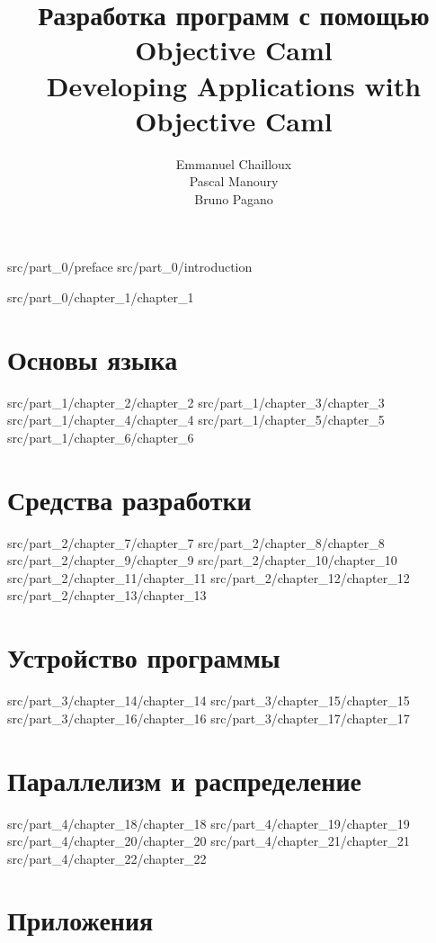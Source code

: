 \documentclass[12pt,a4paper]{book}
\begin{document}
\title{Разработка программ с помощью Objective Caml\\
Developing Applications with Objective Caml}
\author{Emmanuel Chailloux\\ Pascal Manoury\\ Bruno Pagano}

\maketitle

 {src/part_0/preface}
 {src/part_0/introduction}

\tableofcontents

 {src/part_0/chapter_1/chapter_1}

\part{Основы языка}
 {src/part_1/chapter_2/chapter_2}
 {src/part_1/chapter_3/chapter_3}
 {src/part_1/chapter_4/chapter_4}
 {src/part_1/chapter_5/chapter_5}
 {src/part_1/chapter_6/chapter_6}

\part{Средства разработки}
 {src/part_2/chapter_7/chapter_7}
 {src/part_2/chapter_8/chapter_8}
 {src/part_2/chapter_9/chapter_9}
 {src/part_2/chapter_10/chapter_10}
 {src/part_2/chapter_11/chapter_11}
 {src/part_2/chapter_12/chapter_12}
 {src/part_2/chapter_13/chapter_13}

\part{Устройство программы}
 {src/part_3/chapter_14/chapter_14}
 {src/part_3/chapter_15/chapter_15}
 {src/part_3/chapter_16/chapter_16}
 {src/part_3/chapter_17/chapter_17}

\part{Параллелизм и распределение}
 {src/part_4/chapter_18/chapter_18}
 {src/part_4/chapter_19/chapter_19}
 {src/part_4/chapter_20/chapter_20}
 {src/part_4/chapter_21/chapter_21}
 {src/part_4/chapter_22/chapter_22}

\part{Приложения}
\end{document}

